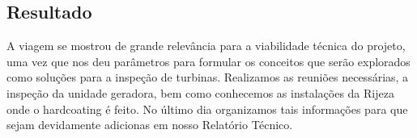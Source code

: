 \documentclass[a4paper,11pt,oneside,openany,brazilian,version=last,draft=false,]{main}
\begin{document}
\begin{twocolumn}
\section{Resultado}
A viagem se mostrou de grande relevância para a viabilidade técnica do projeto,
uma vez que nos deu parâmetros para formular os conceitos que serão explorados
como soluções para a inspeção de turbinas. Realizamos as reuniões
necessárias, a inspeção da unidade geradora, bem como conhecemos as instalações
da Rijeza onde o hardcoating é feito. No último dia organizamos tais informações
para que sejam devidamente adicionas em nosso Relatório Técnico.
\end{twocolumn}
\end{document}
